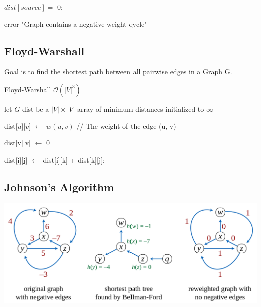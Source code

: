 \documentclass[9pt,landscape,a4paper, table]{extarticle}
\begin{document}
\begin{multicols*}{3}
{\begin{algorithm}[H]
{    }
    $dist[source] =$ 0;
    
    
    {
        {
            error "Graph contains a negative-weight cycle"
        }
    }
\end{algorithm}}



\subsection{Floyd-Warshall}

Goal is to find the shortest path between all pairwise edges in a Graph G.

{\scriptsize
\begin{algorithm}[H]
    \caption{Floyd-Warshall $\mathcal{O}(|V|^3) $}
    
    \SetAlgoLined
    
    
    let $G$ dist be a $|V| × |V|$ array of minimum distances initialized to $\infty$
    
    
{
    dist[$u$][$v$] $\leftarrow$ $w(u, v)$  // The weight of the edge (u, v)
}

{
    dist[v][v] $\leftarrow$ 0
}

{
     {
         { 
             { 
                dist[i][j] $\leftarrow$ dist[i][k] + dist[k][j];
                
            }
        }
    }
}
\end{algorithm}}



\subsection{Johnson's Algorithm}

\begin{center}
    \includegraphics[width=0.7\linewidth]{img/johnson.png}
\end{center}
\vspace{-0.2cm}


\end{multicols*}
\end{document}
